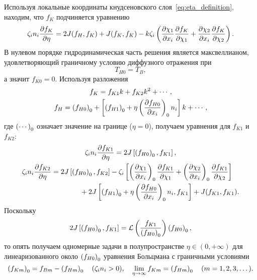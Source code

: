 Используя локальные координаты кнудсеновского слоя~\eqref{eq:eta_definition},
находим, что \(f_K\) подчиняется уравнению
\begin{equation}\label{eq:fK_equation}
    \zeta_in_i\pder[f_K]{\eta} = 2J(f_H,f_K) + J(f_K,f_K)
    - k\zeta_i\left(\pder[\chi_1]{x_i}\pder[f_K]{\chi_1} + \pder[\chi_2]{x_i}\pder[f_K]{\chi_2}\right).
\end{equation}
В нулевом порядке гидродинамическая часть решения является максвеллианом,
удовлетворяющий граничному условию диффузного отражения при
\begin{equation}\label{eq:kgf:boundary_T0}
    T_{H0} = T_B,
\end{equation}
а значит \(f_{K0} = 0\). Используя разложения
\begin{gather}
    f_K = f_{K1}k + f_{K2}k^2 + \cdots, \label{eq:knlayer_expansion}\\
    f_H = \onwall{f_{H0}} + \left[\onwall{f_{H1}} + \eta\onwall{\pder[f_{H0}]{x_i}}n_i \right]k + \cdots, \label{eq:Honwall_expansion}
\end{gather}
где \(\onwall{\cdots}\) означает значение на границе (\(\eta=0\)),
получаем уравнения для \(f_{K1}\) и \(f_{K2}\):
\begin{gather}
    \zeta_in_i\pder[f_{K1}]{\eta} = 2J\left[\onwall{f_{H0}},f_{K1}\right], \label{eq:knlayer1}\\
    \begin{multlined}
        \zeta_in_i\pder[f_{K2}]{\eta} = 2J\left[\onwall{f_{H0}}, f_{K2}\right]
        - \zeta_i\left[\onwall{\pder[\chi_1]{x_i}}\pder[f_{K1}]{\chi_1} + \onwall{\pder[\chi_2]{x_i}}\pder[f_{K1}]{\chi_2}\right] \\
        + 2J\left[\onwall{f_{H1}}+\eta\onwall{\pder[f_{H0}]{x_i}}n_i,f_{K1}\right] + J(f_{K1},f_{K1}).
    \end{multlined}\label{eq:knlayer2}
\end{gather}
Поскольку
\begin{equation}\label{eq:knudsen_linearization}
    2J\left[\onwall{f_{H0}},f_{K1}\right] = \mathcal{L}\left(\frac{f_{K1}}{\onwall{f_{H0}}}\right)\onwall{f_{H0}},
\end{equation}
то опять получаем одномерные задачи в полупространстве \(\eta\in(0,+\infty)\) для линеаризованного
около \(\onwall{f_{H0}}\) уравнения Больцмана с граничными условиями
\begin{equation}\label{eq:fK_bc}
    \onwall{f_{Km}} = f_{Bm} - \onwall{f_{Hm}} \quad (\zeta_in_i>0),
        \quad \lim_{\eta\to\infty} f_{Km} = \onwall{f_{Hm}} \quad (m=1,2,3,\dots).
\end{equation}


